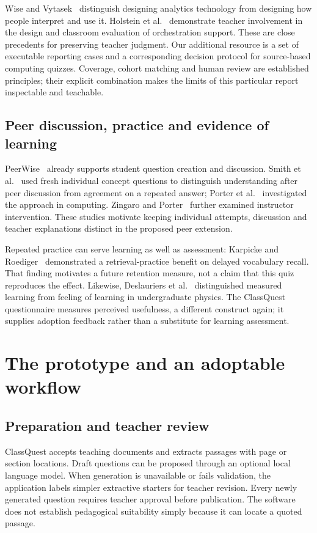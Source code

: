 Wise and Vytasek~\cite{wise} distinguish designing analytics technology from designing how people interpret and use it. Holstein et al.~\cite{holstein} demonstrate teacher involvement in the design and classroom evaluation of orchestration support. These are close precedents for preserving teacher judgment. Our additional resource is a set of executable reporting cases and a corresponding decision protocol for source-based computing quizzes. Coverage, cohort matching and human review are established principles; their explicit combination makes the limits of this particular report inspectable and teachable.

\subsection{Peer discussion, practice and evidence of learning}
PeerWise~\cite{peerwise} already supports student question creation and discussion. Smith et al.~\cite{smith} used fresh individual concept questions to distinguish understanding after peer discussion from agreement on a repeated answer; Porter et al.~\cite{porter} investigated the approach in computing. Zingaro and Porter~\cite{peerinstruction} further examined instructor intervention. These studies motivate keeping individual attempts, discussion and teacher explanations distinct in the proposed peer extension.

Repeated practice can serve learning as well as assessment: Karpicke and Roediger~\cite{karpicke} demonstrated a retrieval-practice benefit on delayed vocabulary recall. That finding motivates a future retention measure, not a claim that this quiz reproduces the effect. Likewise, Deslauriers et al.~\cite{deslauriers} distinguished measured learning from feeling of learning in undergraduate physics. The ClassQuest questionnaire measures perceived usefulness, a different construct again; it supplies adoption feedback rather than a substitute for learning assessment.

\section{The prototype and an adoptable workflow}
\subsection{Preparation and teacher review}
ClassQuest accepts teaching documents and extracts passages with page or section locations. Draft questions can be proposed through an optional local language model. When generation is unavailable or fails validation, the application labels simpler extractive starters for teacher revision. Every newly generated question requires teacher approval before publication. The software does not establish pedagogical suitability simply because it can locate a quoted passage.

